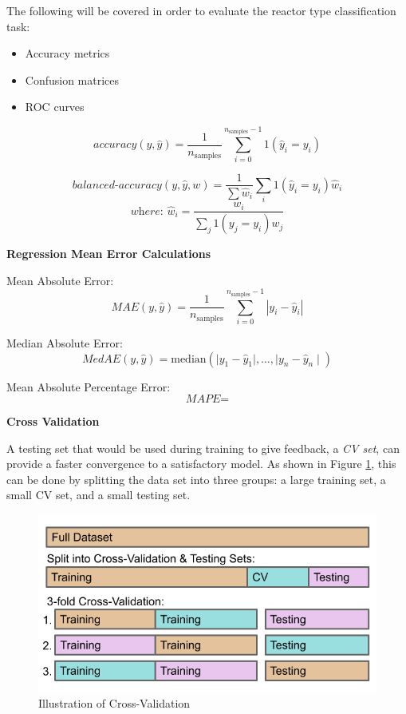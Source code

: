 The following will be covered in order to evaluate the reactor type
classification task:
\begin{itemize}
  \item Accuracy metrics
  \item Confusion matrices 
  \item \Gls{ROC} curves
\end{itemize}

\begin{equation}
  \textit{accuracy}(y, \hat{y}) = \frac{1}{n_\text{samples}} \sum_{i=0}^{n_\text{samples}-1} 1(\hat{y}_i = y_i)
\end{equation}

\begin{equation}
  \textit{balanced-accuracy}(y, \hat{y}, w) = \frac{1}{\sum{\hat{w}_i}} \sum_i 1(\hat{y}_i = y_i) \hat{w}_i
\end{equation}
\[ \textit{where: } \hat{w}_i = \frac{w_i}{\sum_j{1(y_j = y_i) w_j}} \]

\noindent \textbf{Regression Mean Error Calculations}

Mean Absolute Error:
\begin{equation}
  \textit{MAE}(y, \hat{y}) = \frac{1}{n_{\text{samples}}} \sum_{i=0}^{n_{\text{samples}}-1} \left| y_i - \hat{y}_i \right|
\end{equation}

Median Absolute Error:
\begin{equation}
  \textit{MedAE}(y, \hat{y}) = \text{median}(\mid y_1 - \hat{y}_1 \mid, \ldots, \mid y_n - \hat{y}_n \mid)
\end{equation}

Mean Absolute Percentage Error:
\begin{equation}
  \textit{MAPE} = 
\end{equation}

\noindent \textbf{Cross Validation}

A testing set that would be used during training to give feedback, a
\textit{\gls{CV} set}, can provide a faster convergence to a satisfactory
model. As shown in Figure \ref{fig:cverror}, this can be done by splitting the
data set into three groups: a large training set, a small \gls{CV} set, and a
small testing set.  

\begin{figure}[!htb]
  \centering
  \includegraphics[width=0.85\linewidth]{./chapters/litrev/cverror.png}
  \caption{Illustration of Cross-Validation}
  \label{fig:cverror}
\end{figure}


